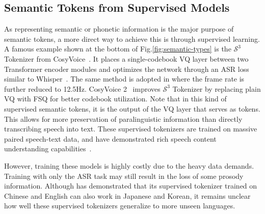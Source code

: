 \subsection{Semantic Tokens from Supervised  Models}
\label{sec:semantic-supervised}
As representing semantic or phonetic information is the major purpose of semantic tokens, a more direct way to achieve this is through supervised learning.
A famous example shown at the bottom of Fig.\ref{fig:semantic-types} is the $\mathcal S^3$ Tokenizer from CosyVoice~\cite{du2024cosyvoice}.
It places a single-codebook VQ layer between two Transformer encoder modules and optimizes the network through an ASR loss similar to Whisper~\cite{whisper}.
The same method is adopted in \cite{zeng2024scaling,zeng2024glm} where the frame rate is further reduced to 12.5Hz.
CosyVoice 2~\cite{cosyvoice2} improves $\mathcal S^3$ Tokenizer by replacing plain VQ with FSQ for better codebook utilization.
Note that in this kind of supervised semantic tokens, it is the output of the VQ layer that serves as tokens.
This allows for more preservation of paralinguistic information than directly transcribing speech into text.
These supervised tokenizers are trained on massive paired speech-text data, and have demonstrated rich speech content understanding capabilities~\cite{du2024cosyvoice,fang2024llamaomni}.

However, training these models is highly costly due to the heavy data demands.
Training with only the ASR task may still result in the loss of some prosody information.
Although \cite{cosyvoice2} has demonstrated that its supervised tokenizer trained on Chinese and English can also work in Japanese and Korean, it remains unclear how well these supervised tokenizers generalize to more unseen languages.
